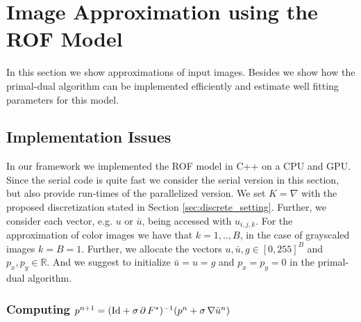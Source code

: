 \documentclass[abstracton]{scrreprt}
\begin{document}
    \section{Image Approximation using the ROF Model} %
    \label{sec:image_approximation_using_the_rof_model}
        
        In this section we show approximations of input images. Besides we show how the primal-dual algorithm can be implemented efficiently and estimate well fitting parameters for this model.

        \subsection{Implementation Issues} %
        \label{sub:implementation_issues}
            
            In our framework we implemented the ROF model in C++ on a CPU and GPU. Since the serial code is quite fast we consider the serial version in this section, but also provide run-times of the parallelized version. We set $K = \nabla$ with the proposed discretization stated in Section \ref{sec:discrete_setting}. Further, we consider each vector, e.g. $u$ or $\bar{u}$, being accessed with $u_{i,j,k}$. For the approximation of color images we have that $k = 1, .., B$, in the case of grayscaled images $k = B = 1$. Further, we allocate the vectors $u, \bar{u}, g \in [0,255]^{B}$ and $p_{x}, p_{y} \in \mathbb{R}$. And we suggest to initialize $\bar{u} = u = g$ and $p_{x} = p_{y} = 0$ in the primal-dual algorithm.

            \subsubsection{Computing $p^{n+1} = (\textnormal{Id} + \sigma\,\partial\,F^{\ast})^{-1}(p^{n} + \sigma\,\nabla\bar{u}^{n})$}
            \label{sub:computing_p}
\end{document}
